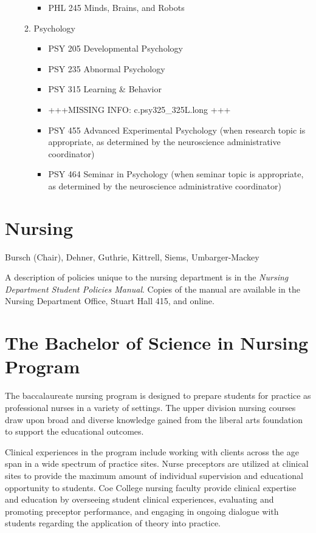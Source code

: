 \documentclass[
  letterpaper,
]{scrbook}
\providecommand{\tightlist}{%
  \setlength{\itemsep}{0pt}\setlength{\parskip}{0pt}}
\begin{document}
\begin{enumerate}
\begin{enumerate}
    \begin{itemize}
    \tightlist
    \item
      PHL 245 Minds, Brains, and Robots
    \end{itemize}
  \item
    Psychology

    \begin{itemize}
    \tightlist
    \item
      PSY 205 Developmental Psychology
    \item
      PSY 235 Abnormal Psychology
    \item
      PSY 315 Learning \& Behavior
    \item
      +++MISSING INFO: c.psy325\_325L.long +++
    \item
      PSY 455 Advanced Experimental Psychology (when research topic is
      appropriate, as determined by the neuroscience administrative
      coordinator)
    \item
      PSY 464 Seminar in Psychology (when seminar topic is appropriate,
      as determined by the neuroscience administrative coordinator)
    \end{itemize}
  \end{enumerate}
\end{enumerate}

\section{Nursing}\label{nursing}

Bursch (Chair), Dehner, Guthrie, Kittrell, Siems, Umbarger-Mackey

A description of policies unique to the nursing department is in the
\emph{Nursing Department Student Policies Manual}. Copies of the manual
are available in the Nursing Department Office, Stuart Hall 415, and
online.

\section{The Bachelor of Science in Nursing
Program}\label{the-bachelor-of-science-in-nursing-program}

The baccalaureate nursing program is designed to prepare students for
practice as professional nurses in a variety of settings. The upper
division nursing courses draw upon broad and diverse knowledge gained
from the liberal arts foundation to support the educational outcomes.

Clinical experiences in the program include working with clients across
the age span in a wide spectrum of practice sites. Nurse preceptors are
utilized at clinical sites to provide the maximum amount of individual
supervision and educational opportunity to students. Coe College nursing
faculty provide clinical expertise and education by overseeing student
clinical experiences, evaluating and promoting preceptor performance,
and engaging in ongoing dialogue with students regarding the application
of theory into practice.
\end{document}
